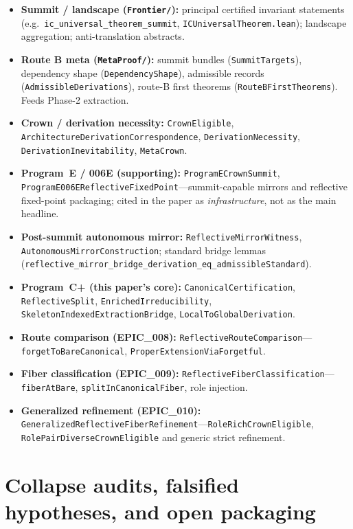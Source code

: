 \documentclass[11pt]{article}
\begin{document}
\begin{itemize}
  \item \textbf{Summit / landscape (\texttt{Frontier/}):} principal certified invariant statements (e.g.\ \texttt{ic\_universal\_theorem\_summit}, \texttt{ICUniversalTheorem.lean}); landscape aggregation; anti-translation abstracts.
  \item \textbf{Route B meta (\texttt{MetaProof/}):} summit bundles (\texttt{SummitTargets}), dependency shape (\texttt{DependencyShape}), admissible records (\texttt{AdmissibleDerivations}), route-B first theorems (\texttt{RouteBFirstTheorems}). Feeds Phase-2 extraction.
  \item \textbf{Crown / derivation necessity:} \texttt{CrownEligible}, \texttt{ArchitectureDerivationCorrespondence}, \texttt{DerivationNecessity}, \texttt{DerivationInevitability}, \texttt{MetaCrown}.
  \item \textbf{Program~E / 006E (supporting):} \texttt{ProgramECrownSummit}, \texttt{ProgramE006EReflectiveFixedPoint}---summit-capable mirrors and reflective fixed-point packaging; cited in the paper as \emph{infrastructure}, not as the main headline.
  \item \textbf{Post-summit autonomous mirror:} \texttt{ReflectiveMirrorWitness}, \texttt{AutonomousMirrorConstruction}; standard bridge lemmas (\texttt{reflective\_mirror\_bridge\_derivation\_eq\_admissibleStandard}).
  \item \textbf{Program~C+ (this paper's core):} \texttt{CanonicalCertification}, \texttt{ReflectiveSplit}, \texttt{EnrichedIrreducibility}, \texttt{SkeletonIndexedExtractionBridge}, \texttt{LocalToGlobalDerivation}.
  \item \textbf{Route comparison (EPIC\_008):} \texttt{ReflectiveRouteComparison}---\texttt{forgetToBareCanonical}, \texttt{ProperExtensionViaForgetful}.
  \item \textbf{Fiber classification (EPIC\_009):} \texttt{ReflectiveFiberClassification}---\texttt{fiberAtBare}, \texttt{splitInCanonicalFiber}, role injection.
  \item \textbf{Generalized refinement (EPIC\_010):} \texttt{GeneralizedReflectiveFiberRefinement}---\texttt{RoleRichCrownEligible}, \texttt{RolePairDiverseCrownEligible} and generic strict refinement.
\end{itemize}

\section{Collapse audits, falsified hypotheses, and open packaging}\label{app:collapse-audits}
\end{document}
